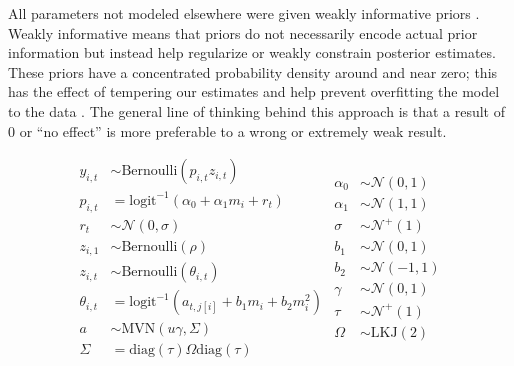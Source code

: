 \documentclass[12pt,letterpaper]{article}
\begin{document}
All parameters not modeled elsewhere were given weakly informative priors \citep{Gelman2013d,McElreath2016,StanDevelopmentTeam2016}. Weakly informative means that priors do not necessarily encode actual prior information but instead help regularize or weakly constrain posterior estimates. These priors have a concentrated probability density around and near zero; this has the effect of tempering our estimates and help prevent overfitting the model to the data \citep{Gelman2013d,McElreath2016,StanDevelopmentTeam2016}. The general line of thinking behind this approach is that a result of 0 or ``no effect'' is more preferable to a wrong or extremely weak result.

\begin{equation}
  \begin{split}
    y_{i, t} &\sim \text{Bernoulli}(p_{i, t} z_{i, t}) \\
    p_{i, t} &= \text{logit}^{-1}(\alpha_{0} + \alpha_{1} m_{i} + r_{t}) \\ 
    r_{t} &\sim \mathcal{N}(0, \sigma) \\
    z_{i, 1} &\sim \text{Bernoulli}(\rho) \\
    z_{i, t} &\sim \text{Bernoulli}(\theta_{i, t}) \\
    \theta_{i, t} &= \text{logit}^{-1}(a_{t, j[i]} + b_{1} m_{i} + b_{2} m_{i}^{2}) \\
    a &\sim \text{MVN}(u \gamma, \Sigma) \\
    \Sigma &= \text{diag}(\tau) \Omega \text{diag}(\tau) \\
  \end{split}
  \begin{split}
    \alpha_{0} &\sim \mathcal{N}(0, 1) \\
    \alpha_{1} &\sim \mathcal{N}(1, 1) \\
    \sigma &\sim \mathcal{N}^{+}(1) \\
    b_{1} &\sim \mathcal{N}(0, 1) \\
    b_{2} &\sim \mathcal{N}(-1, 1) \\
    \gamma &\sim \mathcal{N}(0, 1) \\
    \tau &\sim \mathcal{N}^{+}(1) \\
    \Omega &\sim \text{LKJ}(2) \\
  \end{split}
  \label{eq:pure_presence}
\end{equation}
\end{document}
